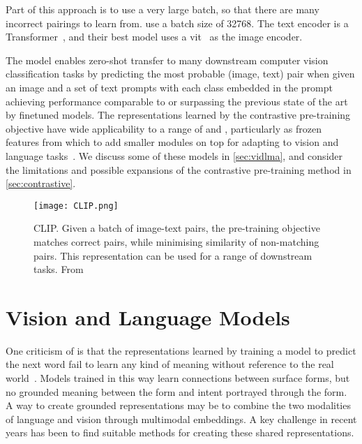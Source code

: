 Part of this approach is to use a very large batch, so that there are many
incorrect pairings to learn from. \citet{radford2021clip} use a batch size of
32768. The text encoder is a Transformer~\citep{vaswani2017attention}, and
their best model uses a \acrlong{vit}~\citep{dosovitskiy2021vit} as the
image encoder.

The model enables zero-shot transfer to many downstream computer vision
classification tasks by predicting the most probable (image, text) pair when
given an image and a set of text prompts with each class embedded in the prompt
achieving performance comparable to or surpassing the previous state of the art
by finetuned models. The representations learned by the contrastive
pre-training objective have wide applicability to a range of 
and , particularly as frozen features from which to add
smaller modules on top for adapting to vision and language
tasks~\citep{alayrac2022flamingo,lin2022evl,luo2022clip4clip}. We discuss some
of these models in \cref{sec:vidlma}, and consider the limitations and possible
expansions of the contrastive pre-training method in \cref{sec:contrastive}.

\begin{figure}[tp]
	\centering
	\texttt{[image: CLIP.png]}
	\caption{CLIP. Given a batch of image-text pairs, the pre-training
	objective matches correct pairs, while minimising similarity of
	non-matching pairs. This representation can be used for a range of
	downstream tasks. From~\citet{radford2021clip}}
	\label{fig:clip}
\end{figure}


\section{Vision and Language Models}
\label{sec:vlm}

One criticism of  is that the representations learned by
training a model to predict the next word fail to learn any kind of meaning
without reference to the real world~\citep{bender2020climbing}. Models trained
in this way learn connections between surface forms, but no grounded meaning
between the form and intent portrayed through the form. A way to create
grounded representations may be to combine the two modalities of language and
vision through multimodal embeddings. A key challenge in recent years has been
to find suitable methods for creating these shared representations.

